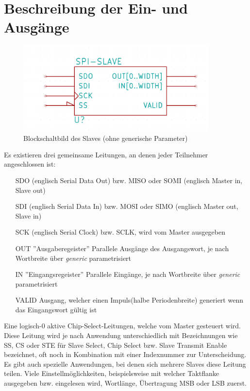 \section{Beschreibung der Ein- und Ausgänge}
\begin{figure}[ht]
    \centering
    \vspace{-1em}
        \includegraphics[width=0.9\textwidth]{img/SLAVE.png}
    \vspace{-1em}    
    \caption{Blockschaltbild des Slaves (ohne generische Parameter)}
    \label{fig:blockSlave}
\end{figure}
\newpage
Es existieren drei gemeinsame Leitungen, an denen jeder Teilnehmer angeschlossen ist:
\begin{itemize}
  \item [SDO] (englisch Serial Data Out) bzw. MISO oder SOMI (englisch Master in, Slave out)
  \item [SDI] (englisch Serial Data In) bzw. MOSI oder SIMO (englisch Master out, Slave in)
  \item [SCK] (englisch Serial Clock) bzw. SCLK, wird vom Master ausgegeben
  \item [OUT] ''Ausgaberegeister'' Parallele Ausgänge des Ausgangswort, je nach Wortbreite über
              \emph{generic} parametrisiert
  \item [IN]  ''Eingangsregeister'' Parallele Eingänge, je nach Wortbreite über
              \emph{generic} parametrisiert
  \item [VALID] Ausgang, welcher einen Impuls(halbe Periodenbreite) generiert wenn das Eingangswort
              gültig ist
\end{itemize}

Eine logisch-0 aktive Chip-Select-Leitungen, welche vom Master gesteuert wird. Diese Leitung wird je
nach Anwendung unterschiedlich mit Bezeichnungen wie SS, CS oder STE für Slave Select, Chip Select bzw.
Slave Transmit Enable bezeichnet, oft noch in Kombination mit einer Indexnummer zur Unterscheidung.
Es gibt auch spezielle Anwendungen, bei denen sich mehrere Slaves diese Leitung teilen. Viele
Einstellmöglichkeiten, beispielsweise mit welcher Taktflanke ausgegeben bzw. eingelesen wird,
Wortlänge, Übertragung MSB oder LSB zuerst.

